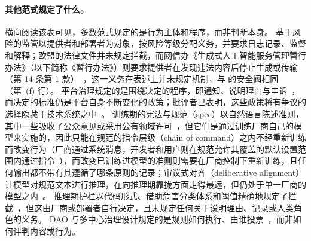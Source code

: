\paragraph{其他范式规定了什么。}
横向阅读该表可见，多数范式规定的是行为主体和程序，而非判断本身。
基于风险的监管以提供者和部署者为对象，按风险等级分配义务，并要求日志记录、监督和解释；欧盟的法律文件并未规定拦截，而网信办《生成式人工智能服务管理暂行办法》（以下简称《暂行办法》）则要求提供者在发现违法内容后停止生成或传输（第 14 条第 1 款）~\cite{cac2023genai}，这一义务在表述上并未规定机制，与 \pol{} 的安全阀相同（第~(f) 行）。
平台治理规定的是围绕决定的程序，即通知、说明理由与申诉~\cite{dsa2022,santaclara2021,klonick2020oversight}，而决定的标准仍是平台自身不断变化的政策；批评者已表明，这些政策将有争议的选择隐藏于技术系统之中~\cite{gorwa2020algorithmic,gillespie2018custodians}。
训练期的宪法与规范（spec）以自然语言陈述准则，其中一些吸收了公众意见或采用公有领域许可~\cite{huang2024collective,openai2025modelspec}，但它们是通过训练厂商自己的模型来实施的，因此只能在规范的指令层级（chain of command）之内不经重新训练而改变行为（厂商通过系统消息，开发者和用户则在规范允许其覆盖的默认设置范围内通过指令~\cite{openai2025modelspec}），而改变已训练进模型的准则则需要在厂商控制下重新训练，且任何输出都不带有其遵循了哪条原则的记录；审议式对齐（deliberative alignment）让模型对规范文本进行推理，在向推理期靠拢方面走得最远，但仍处于单一厂商的模型之内~\cite{guan2024deliberative}。
推理期护栏以代码形式、借助危害分类体系和阈值精确地规定了拦截~\cite{inan2023llama,markov2023holistic,rebedea2023nemo,dong2025safeguarding}，但这由厂商或部署者自行决定，且未规定任何关于说明理由、记录或人类角色的义务。
DAO 与多中心治理设计规定的是规则如何执行、由谁投票~\cite{buterin2014ethereum,hassan2021decentralized,santana2022blockchain,ostrom1990governing,makridis2025polycentric}，而非如何评判内容或行为。


